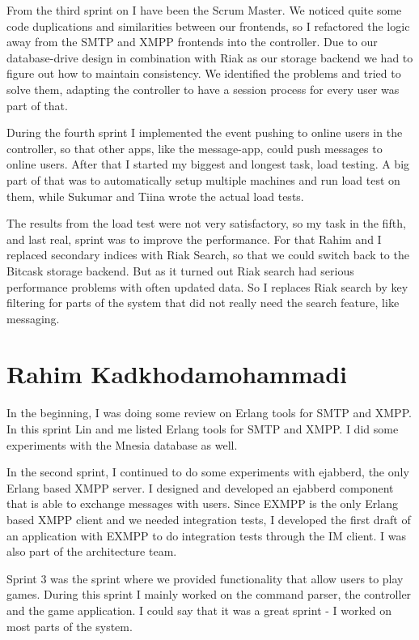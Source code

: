 \documentclass[11pt,a4paper]{report}
\begin{document}
From the third sprint on I have been the Scrum Master. We noticed quite some
code duplications and similarities between our frontends, so I refactored the
logic away from the SMTP and XMPP frontends into the controller. Due to our
database-drive design in combination with Riak as our storage backend we had to
figure out how to maintain consistency. We identified the problems and tried to
solve them, adapting the controller to have a session process for every user was
part of that.

During the fourth sprint I implemented the event pushing to online users in the
controller, so that other apps, like the message-app, could push messages to
online users. After that I started my biggest and longest task, load testing. A
big part of that was to automatically setup multiple machines and run load test
on them, while Sukumar and Tiina wrote the actual load tests.

The results from the load test were not very satisfactory, so my task in the
fifth, and last real, sprint was to improve the performance. For that Rahim and
I replaced secondary indices with Riak Search, so that we could switch back to
the Bitcask storage backend. But as it turned out Riak search had serious
performance problems with often updated data.  So I replaces Riak search by key
filtering for parts of the system that did not really need the search feature,
like messaging.

\section{Rahim Kadkhodamohammadi}
In the beginning, I was doing some review on Erlang tools for SMTP and XMPP. In
this sprint Lin and me listed Erlang tools for SMTP and XMPP. I did some
experiments with the Mnesia database as well.

In the second sprint, I continued to do some experiments with ejabberd, the only
Erlang based XMPP server. I designed and developed an ejabberd component that is
able to exchange messages with users. Since EXMPP is the only Erlang based XMPP
client and we needed integration tests, I developed the first draft of an
application with EXMPP to do integration tests through the IM client. I was also
part of the architecture team.

Sprint 3 was the sprint where we provided functionality that allow users to play
games. During this sprint I mainly worked on the command parser, the controller
and the game application. I could say that it was a great sprint - I worked on
most parts of the system.
\end{document}
